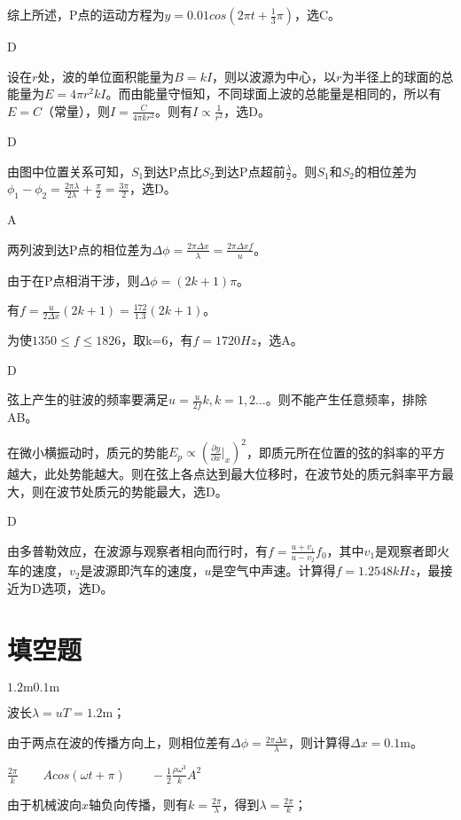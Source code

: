 综上所述，P点的运动方程为$y=0.01cos(2\pi t+\frac{1}{3}\pi)$，选C。

\exercise D

\solve  设在$r$处，波的单位面积能量为$B=kI$，则以波源为中心，以$r$为半径上的球面的总能量为$E=4\pi r^2 kI$。而由能量守恒知，不同球面上波的总能量是相同的，所以有$E=C$（常量），则$I=\frac{C}{4\pi k r^2}$。则有$I\propto \frac{1}{r^2}$，选D。

\exercise D

\solve 由图中位置关系可知，$S_1$到达P点比$S_2$到达P点超前$\frac{\lambda}{2}$。则$S_1$和$S_2$的相位差为$\phi_1-\phi_2=\frac{ 2\pi\lambda}{2 \lambda}+\frac{\pi}{2}=\frac{3\pi}{2}$，选D。 

\exercise A

\solve 两列波到达P点的相位差为$\Delta\phi=\frac{2\pi\Delta x}{\lambda}=\frac{2\pi\Delta x f}{u}$。

由于在P点相消干涉，则$\Delta\phi=(2k+1)\pi$。

有$f=\frac{u}{2\Delta x}(2k+1)=\frac{172}{1.3}(2k+1)$。

为使$1350\leqslant f \leqslant 1826$，取k=6，有$f=1720Hz$，选A。

\exercise D

\solve 弦上产生的驻波的频率要满足$u=\frac{u}{2f}k,k=1,2\ldots$。则不能产生任意频率，排除AB。

在微小横振动时，质元的势能$E_p\propto (\frac{\partial y}{\partial x}|_x)^2$，即质元所在位置的弦的斜率的平方越大，此处势能越大。则在弦上各点达到最大位移时，在波节处的质元斜率平方最大，则在波节处质元的势能最大，选D。

\exercise D

\solve 由多普勒效应，在波源与观察者相向而行时，有$f=\frac{u+v_1}{u-v_2}f_0$，其中$v_1$是观察者即火车的速度，$v_2$是波源即汽车的速度，$u$是空气中声速。计算得$f=1.2548kHz$，最接近为D选项，选D。

\section{填空题}
\exercise $1.2\mathrm{m}$\qquad$0.1\mathrm{m}$

\solve 波长$\lambda=uT=1.2\mathrm{m}$；

由于两点在波的传播方向上，则相位差有$\Delta \phi=\frac{2\pi \Delta x}{\lambda}$，则计算得$\Delta x=0.1\mathrm{m}$。

\exercise $\frac{2\pi}{k}\qquad Acos(\omega t+\pi)\qquad -\frac{1}{2}\frac{\rho \omega^3}{k}A^2$

\solve 由于机械波向$x$轴负向传播，则有$k=\frac{2\pi}{\lambda}$，得到$\lambda=\frac{2\pi}{k}$；

